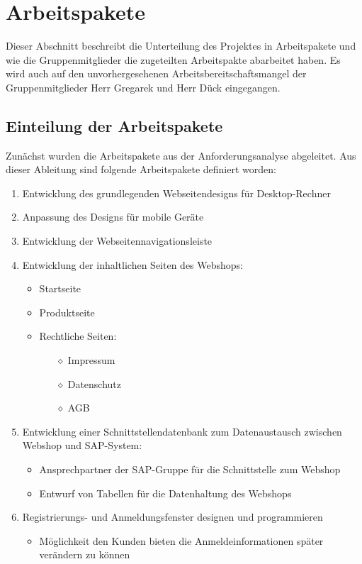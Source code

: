 \section{Arbeitspakete}
Dieser Abschnitt beschreibt die Unterteilung des Projektes in Arbeitspakete und wie die Gruppenmitglieder die zugeteilten Arbeitspakte abarbeitet haben. Es wird auch auf den unvorhergesehenen Arbeitsbereitschaftsmangel der Gruppenmitglieder Herr Gregarek und Herr Dück eingegangen.

\subsection{Einteilung der Arbeitspakete}
Zunächst wurden die Arbeitspakete aus der Anforderungsanalyse abgeleitet. Aus dieser Ableitung sind folgende Arbeitspakete definiert worden:
\begin{enumerate}
	\item Entwicklung des grundlegenden Webseitendesigns für Desktop-Rechner
	\item Anpassung des Designs für mobile Geräte
	\item Entwicklung der Webseitennavigationsleiste
	\item Entwicklung der inhaltlichen Seiten des Webshops:
	\begin{itemize}
		\item Startseite
		\item Produktseite
		\item Rechtliche Seiten:
		\begin{itemize}
			\item[$\diamond$] Impressum
			\item[$\diamond$] Datenschutz
			\item[$\diamond$] AGB
		\end{itemize}
	\end{itemize}
	\item Entwicklung einer Schnittstellendatenbank zum Datenaustausch zwischen Webshop und SAP-System:
	\begin{itemize}
		\item Ansprechpartner der SAP-Gruppe für die Schnittstelle zum Webshop
		\item Entwurf von Tabellen für die Datenhaltung des Webshops 
	\end{itemize}
	\item Registrierungs- und Anmeldungsfenster designen und programmieren
	\begin{itemize}
		\item Möglichkeit den Kunden bieten die Anmeldeinformationen später verändern zu können

\end{itemize}
\end{enumerate}
